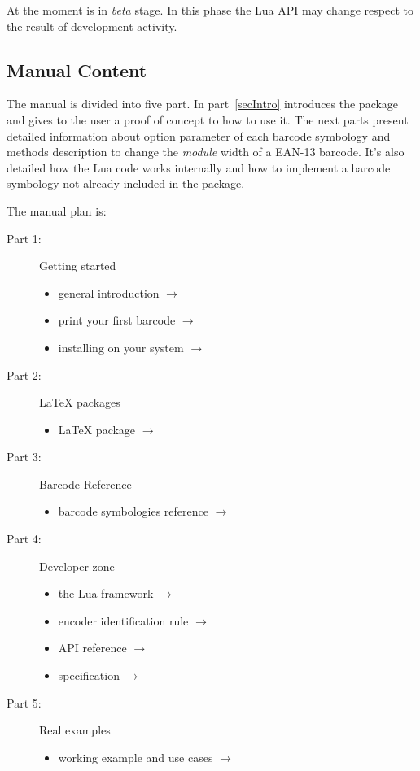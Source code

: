 \documentclass[11pt,a4paper]{article}
\begin{document}
At the moment \brcd{} is in \emph{beta} stage. In this phase the Lua API may
change respect to the result of development activity.


\subsection{Manual Content}

The manual is divided into five part. In part~\ref{secIntro} introduces the
package and gives to the user a proof of concept to how to use it. The next
parts present detailed information about option parameter of each barcode
symbology and methods description to change the \emph{module} width of a EAN-13
barcode. It's also detailed how the Lua code works internally and how to
implement a barcode symbology not already included in the package.

The manual plan is:
\begin{description}
\item[Part 1:] Getting started
\begin{itemize}
	\item general introduction \( \to \) \pageref{secIntro}
	\item print your first barcode \( \to \) \pageref{secEnter}
	\item installing \brcd{} on your system \( \to \) \pageref{secInstall}
\end{itemize}

\item[Part 2:] \LaTeX{} packages
\begin{itemize}
	\item \brcd{} \LaTeX{} package \( \to \) \pageref{secLaTeXPkg}
\end{itemize}

\item[Part 3:] Barcode Reference
\begin{itemize}
	\item barcode symbologies reference \( \to \) \pageref{secBcRef}
\end{itemize}

\item[Part 4:] Developer zone
\begin{itemize}
	\item the Lua framework \( \to \) \pageref{secFramework}
    \item encoder identification rule \( \to \) \pageref{secEncName}
	\item API reference \( \to \) \pageref{secAPI}
	\item {} specification \( \to \) \pageref{secGA}
\end{itemize}

\item[Part 5:] Real examples
\begin{itemize}
	\item working example and use cases \( \to \) \pageref{secExample}
\end{itemize}
\end{description}
\end{document}
